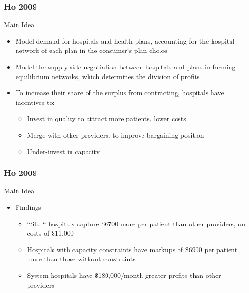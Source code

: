 \documentclass[aspectratio=169,11pt]{beamer}
\begin{document}
\begin{frame}
\frametitle{Ho 2009}

Main Idea
\begin{itemize}
	\item Model demand for hospitals and health plans, accounting for the hospital network of each plan in the consumer`s plan choice
	\item Model the supply side negotiation between hospitals and plans in forming equilibrium networks, which determines the division of profits
        \item To increase their share of the surplus from contracting, hospitals have incentives to:
         \begin{itemize}
	\item Invest in quality to attract more patients, lower costs
	\item Merge with other providers, to improve bargaining position
	\item Under-invest in capacity
	\end{itemize}
\end{itemize}
\end{frame}


\begin{frame}
\frametitle{Ho 2009}

Main Idea
\begin{itemize}
\item Findings
\begin{itemize}
\item ``Star`` hospitals capture \$6700 more per patient than other providers, on costs of \$11,000
\item Hospitals with capacity constraints have markups of \$6900 per patient more than those without constraints
\item System hospitals have \$180,000/month greater profits than other providers
\end{itemize}
\end{itemize}
\end{frame}

\end{document}
